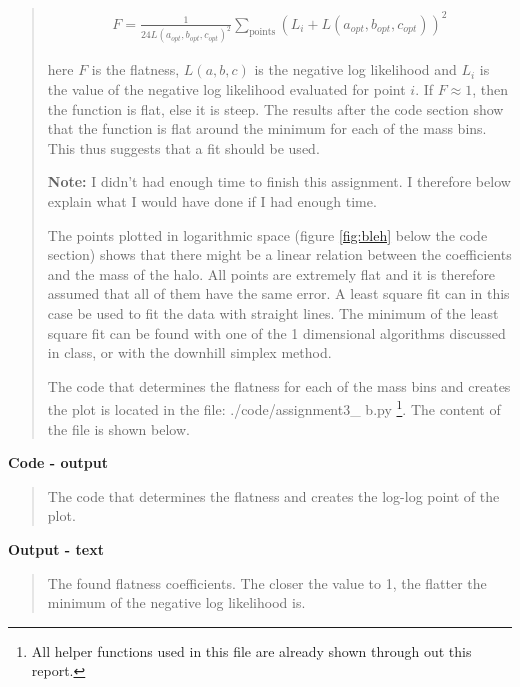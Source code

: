 \begin{quote}
\begin{align}
F =  \frac{1}{24 L(a_{opt}, b_{opt}, c_{opt})^2} \sum_{\text{points}} \left( L_i + L(a_{opt}, b_{opt}, c_{opt}) \right)^2
\end{align}

here $F$ is the flatness, $L(a,b,c)$ is the negative log likelihood and $L_i$ is the value of the negative log likelihood evaluated for point $i$. If $F \approx 1$, then the function is flat, else it is steep. The results after the code section show that the function is flat around the minimum for each of the mass bins. This thus suggests that a fit should be used.

\textbf{Note:} I didn't had enough time to finish this assignment. I therefore below explain what I would have done if I had enough time.

The points plotted in logarithmic space (figure \ref{fig:bleh} below the code section) shows that there might be a linear relation between the coefficients and the mass of the halo. All points are extremely flat and it is therefore assumed that all of them have the same error. A least square fit can in this case be used to fit the data with straight lines. The minimum of the least square fit can be found with one of the 1 dimensional algorithms discussed in class, or with the downhill simplex method.


The code that determines the flatness for each of the mass bins and creates the plot is located in the file: \textsf{./code/assignment3\_ b.py} \footnote{All helper functions used in this file are already shown through out this report.}. The content of the file is shown below. 
\end{quote}

\newpage

\textbf{Code - output}
\begin{quote}
The code that determines the flatness and creates the log-log point of the plot.

\end{quote}


\textbf{Output - text}
\begin{quote}
The found flatness coefficients. The closer the value to 1, the flatter the minimum of the negative log likelihood is.

\end{quote}


